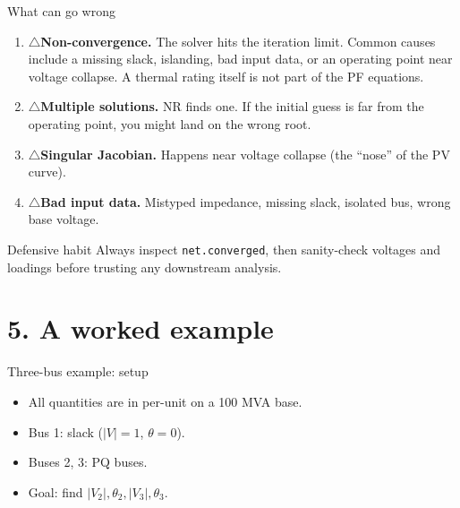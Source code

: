 \documentclass[aspectratio=169,10pt]{beamer}
\newcommand{\code}[1]{\texttt{#1}}
\newcommand{\warnitem}{\textcolor{warnorange}{\Large$\triangle$}\;}
\begin{document}
\begin{frame}{What can go wrong}
\begin{enumerate}
  \item \warnitem \textbf{Non-convergence.} The solver hits the iteration limit. Common causes include a missing slack, islanding, bad input data, or an operating point near voltage collapse. A thermal rating itself is not part of the PF equations.
  \item \warnitem \textbf{Multiple solutions.} NR finds one. If the initial guess is far from the operating point, you might land on the wrong root.
  \item \warnitem \textbf{Singular Jacobian.} Happens near voltage collapse (the ``nose'' of the PV curve).
  \item \warnitem \textbf{Bad input data.} Mistyped impedance, missing slack, isolated bus, wrong base voltage.
\end{enumerate}
\begin{block}{Defensive habit}
Always inspect \code{net.converged}, then sanity-check voltages and loadings before trusting any downstream analysis.
\end{block}
\end{frame}

\section*{5. A worked example}

\begin{frame}{Three-bus example: setup}
\centering
{}
\vspace{0.6em}
\begin{itemize}
  \item All quantities are in per-unit on a 100 MVA base.
  \item Bus 1: slack ($|V|=1$, $\theta=0$).
  \item Buses 2, 3: PQ buses.
  \item Goal: find $|V_2|, \theta_2, |V_3|, \theta_3$.
\end{itemize}
\end{frame}
\end{document}

